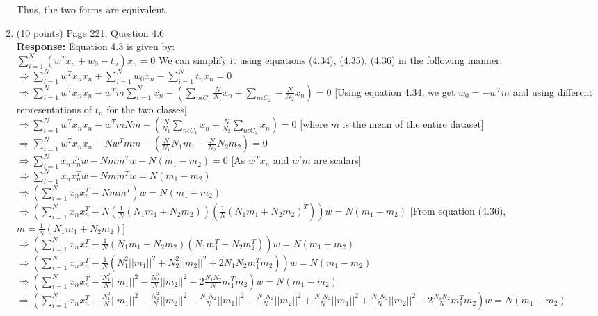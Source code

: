 \documentclass[11pt]{article}
\begin{document}
\begin{enumerate}
Thus, the two forms are equivalent. 
\item (10 points) Page 221, Question 4.6\\
\textbf{Response:}
Equation 4.3 is given by:\\
$\displaystyle \sum_{i=1}^N (w^T x_n + w_0 - t_n) x_n = 0$
We can simplify it using equations (4.34), (4.35), (4.36) in the following manner:\\
$\displaystyle \Rightarrow \sum_{i=1}^N w^T x_n x_n + \sum_{i=1}^N w_0 x_n - \sum_{i=1}^N t_n x_n = 0$\\
$\displaystyle \Rightarrow \sum_{i=1}^N w^T x_n x_n - w^T m \sum_{i=1}^N x_n - (\sum_{n \epsilon C_1} \frac{N}{N_1} x_n + \sum_{n \epsilon C_2} -\frac{N}{N_2} x_n) = 0$ [Using equation 4.34, we get $w_0 = -w^T m$ and using different representations of $t_n$ for the two classes]\\
$\displaystyle \Rightarrow \sum_{i=1}^N w^T x_n x_n - w^T m Nm - (\frac{N}{N_1} \sum_{n \epsilon C_1} x_n - \frac{N}{N_2} \sum_{n \epsilon C_2} x_n) = 0$ [where $m$ is the mean of the entire dataset]\\
$\displaystyle \Rightarrow \sum_{i=1}^N w^T x_n x_n - N w^T m m - (\frac{N}{N_1} N_1m_1 - \frac{N}{N_2} N_2 m_2) = 0$\\
$\displaystyle \Rightarrow \sum_{i=1}^N x_n x_n^T w - N m m^T w - N(m_1 - m_2) = 0$ [As $w^T x_n$ and $w^t m$ are scalars]\\
$\displaystyle \Rightarrow \sum_{i=1}^N x_n x_n^T w - N m m^T w = N(m_1 - m_2)$\\
$\displaystyle \Rightarrow (\sum_{i=1}^N x_n x_n^T  - N m m^T) w = N(m_1 - m_2)$\\
$\displaystyle \Rightarrow (\sum_{i=1}^N x_n x_n^T  - N (\frac{1}{N} (N_1 m_1 + N_2 m_2)) (\frac{1}{N}(N_1 m_1 + N_2 m_2)^T)) w = N(m_1 - m_2)$ [From equation (4.36), $\displaystyle m=\frac{1}{N} (N_1m_1 + N_2m_2)]$ \\ 
$\displaystyle \Rightarrow (\sum_{i=1}^N x_n x_n^T  - \frac{1}{N}(N_1 m_1 + N_2 m_2) (N_1 m_1^T + N_2 m_2^T)) w = N(m_1 - m_2)$\\
$\displaystyle \Rightarrow (\sum_{i=1}^N x_n x_n^T  - \frac{1}{N}(N_1^2||m_1||^2 + N_2^2||m_2||^2 + 2 N_1 N_2 m_1^T m_2)) w = N(m_1 - m_2)$\\
$\displaystyle \Rightarrow (\sum_{i=1}^N x_n x_n^T  - \frac{N_1^2}{N}||m_1||^2 - \frac{N_2^2}{N}||m_2||^2 - 2 \frac{N_1 N_2}{N} m_1^T m_2) w = N(m_1 - m_2)$\\
$\displaystyle \Rightarrow (\sum_{i=1}^N x_n x_n^T  - \frac{N_1^2}{N}||m_1||^2 - \frac{N_2^2}{N}||m_2||^2 - \frac{N_1 N_2}{N} ||m_1||^2 - \frac{N_1 N_2}{N} ||m_2||^2  + \frac{N_1 N_2}{N} ||m_1||^2 + \frac{N_1 N_2}{N} ||m_2||^2 - 2 \frac{N_1 N_2}{N} m_1^T m_2) w = N(m_1 - m_2)$\\

\end{enumerate}
\end{document}
